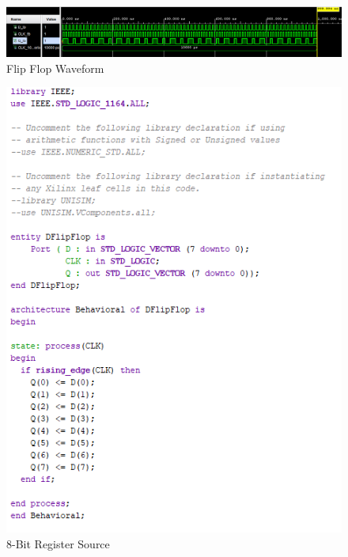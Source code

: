 \documentclass{article}
\begin{document}
\begin{figure}[h]
\begin{center}
\includegraphics[width=1\textwidth]{FlipFlopWaveForm.png} %
\caption{Flip Flop Waveform}
\end{center}
\end{figure}



\begin{figure}[h]
\begin{center}
\includegraphics[width=1\textwidth]{8BitRegisterSource.png} %
\caption{8-Bit Register Source}
\end{center}
\end{figure}
\end{document}
